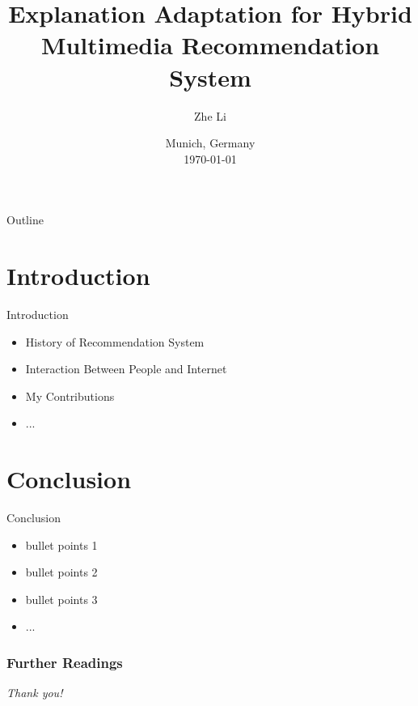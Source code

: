 \documentclass[10pt]{beamer}
\title[Explanation Adaptation for HRS]{
    Explanation Adaptation for Hybrid Multimedia Recommendation System
}
\author[Zhe Li, 2020]{
    Zhe Li
}
\institute[LMU]{
    University of Munich \\
    \texttt{\href{li.zhe@campus.lmu.de}{li.zhe@campus.lmu.de}}
    }
\date[Thesis Disputation, \today, 2020]{
     Munich, Germany\\
    \today
}
\begin{document}
\begin{frame}
\titlepage
\end{frame}

\begin{frame}{Outline}
    \tableofcontents
\end{frame}






\section{Introduction}
\begin{frame}{Introduction}
    \begin{itemize}
        \item History of Recommendation System \pause
        \item Interaction Between People and Internet \pause
        \item My Contributions \pause
        \item ...
    \end{itemize}
\end{frame}

\section{Conclusion}
\begin{frame}{Conclusion}
    \small
    \pause
    \begin{itemize}
        \item bullet points 1
        \item bullet points 2
        \item bullet points 3 \cite{lamport2007writings}
        \item ...
    \end{itemize}
\end{frame}

\begin{frame}[allowframebreaks]
\frametitle{{Further Readings}}


\end{frame}

\begin{frame}{}
    \centering \Large
    \emph{Thank you!}
  \end{frame}
\end{document}
